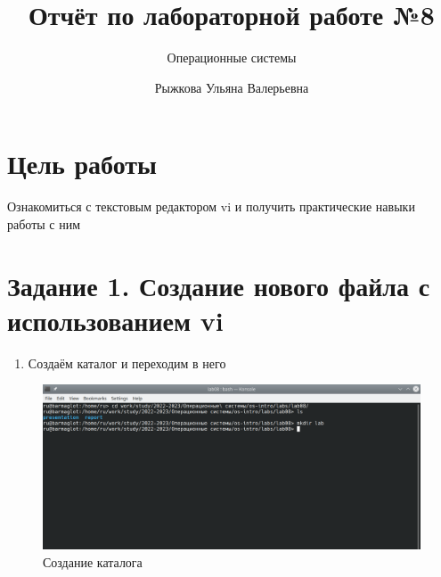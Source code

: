 \documentclass[
  12pt,
  a4paper,
]{scrreprt}
\title{Отчёт по лабораторной работе №8}
\subtitle{Операционные системы}
\author{Рыжкова Ульяна Валерьевна}
\date{}
\providecommand{\tightlist}{%
  \setlength{\itemsep}{0pt}\setlength{\parskip}{0pt}}
\begin{document}
\maketitle

\renewcommand*\contentsname{Содержание}
{
\setcounter{tocdepth}{2}
\tableofcontents
}
\listoffigures
\listoftables
{}

\hypertarget{ux446ux435ux43bux44c-ux440ux430ux431ux43eux442ux44b}{%
\chapter{Цель
работы}\label{ux446ux435ux43bux44c-ux440ux430ux431ux43eux442ux44b}}

Ознакомиться с текстовым редактором vi и получить практические навыки
работы с ним

\hypertarget{ux437ux430ux434ux430ux43dux438ux435-1.-ux441ux43eux437ux434ux430ux43dux438ux435-ux43dux43eux432ux43eux433ux43e-ux444ux430ux439ux43bux430-ux441-ux438ux441ux43fux43eux43bux44cux437ux43eux432ux430ux43dux438ux435ux43c-vi}{%
\chapter{Задание 1. Создание нового файла с использованием
vi}\label{ux437ux430ux434ux430ux43dux438ux435-1.-ux441ux43eux437ux434ux430ux43dux438ux435-ux43dux43eux432ux43eux433ux43e-ux444ux430ux439ux43bux430-ux441-ux438ux441ux43fux43eux43bux44cux437ux43eux432ux430ux43dux438ux435ux43c-vi}}

\begin{enumerate}
\def\labelenumi{\arabic{enumi}.}
\tightlist
\item
  Создаём каталог и переходим в него
\end{enumerate}

\begin{figure}
\hypertarget{fig:001}{%
\centering
\includegraphics[width=1\textwidth,height=\textheight]{image/1.png}
\caption{Создание каталога}\label{fig:001}
}
\end{figure}
\end{document}
